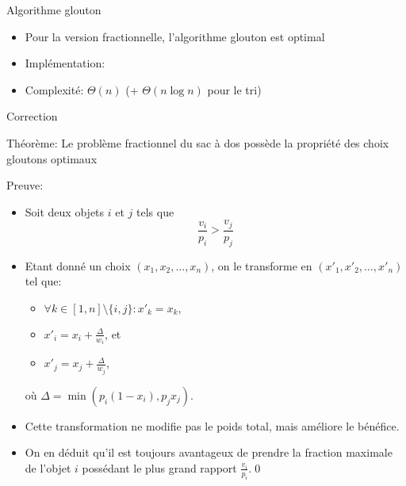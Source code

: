 \begin{frame}{Algorithme glouton}

\begin{itemize}
\item Pour la version fractionnelle, l'algorithme glouton est optimal
\item Implémentation:

\bigskip

{\small
\begin{center}
\end{center}
}
\bigskip

\item Complexité: $\Theta(n)$ (+ $\Theta(n\log n)$ pour le tri)
\end{itemize}

\end{frame}

\begin{frame}{Correction}

\alert{Théorème:} Le problème fractionnel du sac à dos possède la propriété des choix gloutons optimaux

\bigskip

\alert{Preuve:}
\begin{itemize}
\item Soit deux objets $i$ et $j$ tels que
$$\frac{v_i}{p_i}>\frac{v_j}{p_j}$$
\item Etant donné un choix $(x_1,x_2,\ldots,x_n)$, on le transforme en $(x'_1,x'_2,\ldots, x'_n)$ tel que:
\begin{itemize}
\item $\forall k\in [1,n]\setminus\{i,j\}: x'_k=x_k,$
\item $x'_i=x_i+\frac{\Delta}{w_i}$, et
\item $x'_j=x_j+\frac{\Delta}{w_j}$,
\end{itemize}
où $\Delta=\min(p_i(1-x_i),p_jx_j)$.
\item Cette transformation ne modifie pas le poids total, mais améliore le bénéfice.
\item On en déduit qu'il est toujours avantageux de prendre la fraction maximale de l'objet $i$ possédant le plus grand rapport $\frac{v_i}{p_i}$.\qed
\end{itemize}

\end{frame}

